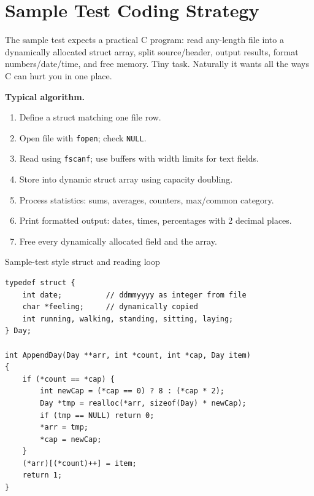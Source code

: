 \documentclass[9pt,a4paper]{article}
\newcommand{\code}[1]{\texttt{#1}}
\begin{document}
\section{Sample Test Coding Strategy}
\begin{idea}
The sample test expects a practical C program: read any-length file into a dynamically allocated struct array, split source/header, output results, format numbers/date/time, and free memory. Tiny task. Naturally it wants all the ways C can hurt you in one place.
\end{idea}

\textbf{Typical algorithm.}
\begin{enumerate}
  \item Define a struct matching one file row.
  \item Open file with \code{fopen}; check \code{NULL}.
  \item Read using \code{fscanf}; use buffers with width limits for text fields.
  \item Store into dynamic struct array using capacity doubling.
  \item Process statistics: sums, averages, counters, max/common category.
  \item Print formatted output: dates, times, percentages with 2 decimal places.
  \item Free every dynamically allocated field and the array.
\end{enumerate}

\begin{codebox}{Sample-test style struct and reading loop}
\begin{lstlisting}[style=cstyle]
typedef struct {
    int date;          // ddmmyyyy as integer from file
    char *feeling;     // dynamically copied
    int running, walking, standing, sitting, laying;
} Day;

int AppendDay(Day **arr, int *count, int *cap, Day item)
{
    if (*count == *cap) {
        int newCap = (*cap == 0) ? 8 : (*cap * 2);
        Day *tmp = realloc(*arr, sizeof(Day) * newCap);
        if (tmp == NULL) return 0;
        *arr = tmp;
        *cap = newCap;
    }
    (*arr)[(*count)++] = item;
    return 1;
}
\end{lstlisting}
\end{codebox}
\end{document}
